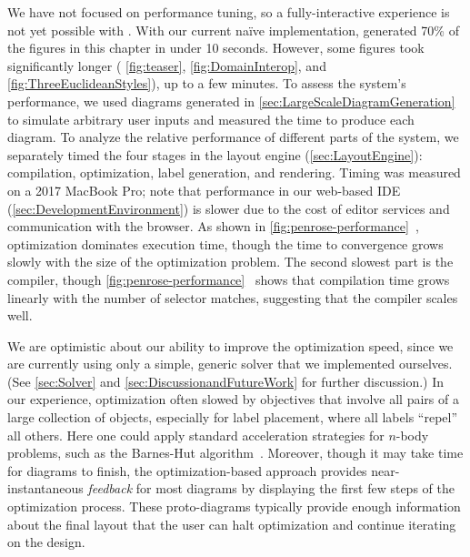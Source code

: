 We have not focused on performance tuning, so a fully-interactive experience is not yet possible with \Penrose{}. With our current na\"ive implementation, \Penrose{} generated 70\% of the figures in this chapter in under 10 seconds. However, some figures took significantly longer (\eg{} \cref{fig:teaser}, \cref{fig:DomainInterop}, and \cref{fig:ThreeEuclideanStyles}), up to a few minutes. To assess the system's performance, we used diagrams generated in \cref{sec:LargeScaleDiagramGeneration} to simulate arbitrary user inputs and measured the time to produce each diagram. To analyze the relative performance of different parts of the system, we separately timed the four stages in the layout engine (\cref{sec:LayoutEngine}): compilation, optimization, label generation, and rendering.  Timing was measured on a 2017 MacBook Pro; note that performance in our web-based IDE (\cref{sec:DevelopmentEnvironment}) is slower due to the cost of editor services and communication with the browser.  As shown in \cref{fig:penrose-performance}~, optimization dominates execution time, though the time to convergence grows slowly with the size of the optimization problem. The second slowest part is the compiler, though \cref{fig:penrose-performance}~ shows that compilation time grows linearly with the number of selector matches, suggesting that the compiler scales well.

We are optimistic about our ability to improve the optimization speed, since we are currently using only a simple, generic solver that we implemented ourselves. (See \cref{sec:Solver} and \cref{sec:DiscussionandFutureWork} for further discussion.) In our experience, optimization often slowed by objectives that involve all pairs of a large collection of objects, especially for label placement, where all labels ``repel'' all others.  Here one could apply standard acceleration strategies for \(n\)-body problems, such as the Barnes-Hut algorithm~\cite{Barnes:1986:barneshut}.  Moreover, though it may take time for diagrams to finish, the optimization-based approach provides near-instantaneous \emph{feedback} for most diagrams by displaying the first few steps of the optimization process.  These proto-diagrams typically provide enough information about the final layout that the user can halt optimization and continue iterating on the design.



